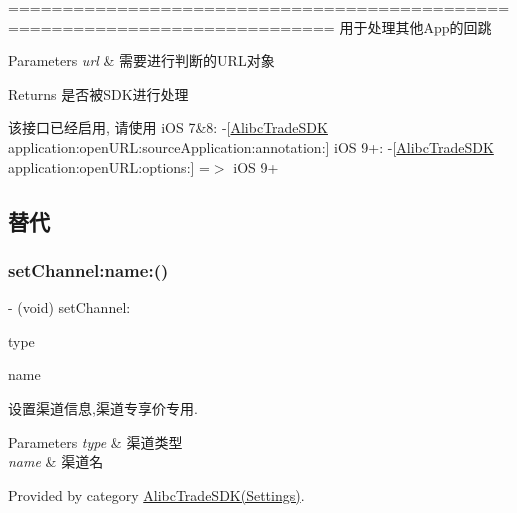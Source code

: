 ============================================================================ 用于处理其他\+App的回跳


\begin{DoxyParams}{Parameters}
{\em url} & 需要进行判断的\+U\+R\+L对象\\
\hline
\end{DoxyParams}
\begin{DoxyReturn}{Returns}
是否被\+S\+D\+K进行处理
\end{DoxyReturn}
该接口已经启用, 请使用 i\+OS 7\&8\+: -\/\mbox{[}\mbox{\hyperlink{interface_alibc_trade_s_d_k}{Alibc\+Trade\+S\+DK}} application\+:open\+U\+R\+L\+:source\+Application\+:annotation\+:\mbox{]} i\+OS 9+\+: -\/\mbox{[}\mbox{\hyperlink{interface_alibc_trade_s_d_k}{Alibc\+Trade\+S\+DK}} application\+:open\+U\+R\+L\+:options\+:\mbox{]} =$>$ i\+OS 9+ \subsection*{替代 }\mbox{\label{interface_alibc_trade_s_d_k_ab52eb7ebf4462b6f44f3441df9c75e03}} 
\subsubsection{\texorpdfstring{set\+Channel\+:name\+:()}{setChannel:name:()}}
{\footnotesize\ttfamily -\/ (void) set\+Channel\+: \begin{DoxyParamCaption}\item[{(N\+S\+String $\ast$)}]{type }\item[{name:(N\+S\+String $\ast$)}]{name }\end{DoxyParamCaption}}

设置渠道信息,渠道专享价专用.


\begin{DoxyParams}{Parameters}
{\em type} & 渠道类型 \\
\hline
{\em name} & 渠道名 \\
\hline
\end{DoxyParams}


Provided by category \mbox{\hyperlink{category_alibc_trade_s_d_k_07_settings_08_ab52eb7ebf4462b6f44f3441df9c75e03}{Alibc\+Trade\+S\+D\+K(\+Settings)}}.

\mbox{\label{interface_alibc_trade_s_d_k_a08d8381b1c9bef18ff5ee50ced4747b4}} 
